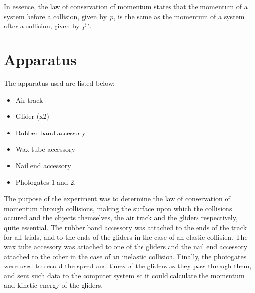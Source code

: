\documentclass{article}
\theoremstyle{definition}
\begin{document}
In essence, the law of conservation of momentum states that the momentum of a system before a collision, given by $\vec{p}$,
is the same as the momentum of a system after a collision, given by $\vec{p}\,'$.

\section{Apparatus}
The apparatus used are listed below: 
\begin{itemize}
    \item Air track
    \item Glider (x2)
    \item Rubber band accessory
    \item Wax tube accessory
    \item Nail end accessory 
    \item Photogates 1 and 2.
\end{itemize}
The purpose of the experiment was to determine the law of conservation of momentum through collisions, making the surface upon which
the collisions occured and the objects themselves, the air track and the gliders respectively, quite essential. 
The rubber band accessory was attached to the ends of the track for all trials, and to the ends of the gliders in the case of an elastic collision.
The wax tube accessory was attached to one of the gliders and the nail end accessory attached to the other in the case of an inelastic collision. Finally, 
the photogates were used to record the speed and times of the gliders as they pass through them, and sent such data to the computer system so it could 
calculate the momentum and kinetic energy of the gliders. 
\end{document}
